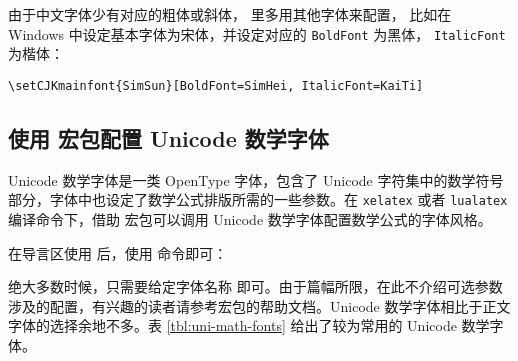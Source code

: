 由于中文字体少有对应的粗体或斜体， 里多用其他字体来配置，
比如在 Windows 中设定基本字体为宋体，并设定对应的 \texttt{BoldFont} 为黑体， \texttt{ItalicFont} 为楷体：
\begin{verbatim}
\setCJKmainfont{SimSun}[BoldFont=SimHei, ItalicFont=KaiTi]
\end{verbatim}

\subsection{使用  宏包配置 Unicode 数学字体}\label{subsec:unicode-math}

Unicode 数学字体是一类 OpenType 字体，包含了 Unicode 字符集中的数学符号部分，字体中也设定了数学公式排版所需的一些参数。在 \texttt{xelatex} 或者 \texttt{lualatex} 编译命令下，借助  宏包可以调用 Unicode 数学字体配置数学公式的字体风格。

在导言区使用  后，使用  命令即可：
\begin{command}
\end{command}

绝大多数时候，只需要给定字体名称  即可。由于篇幅所限，在此不介绍可选参数  涉及的配置，有兴趣的读者请参考宏包的帮助文档。Unicode 数学字体相比于正文字体的选择余地不多。表 \ref{tbl:uni-math-fonts} 给出了较为常用的 Unicode 数学字体。

